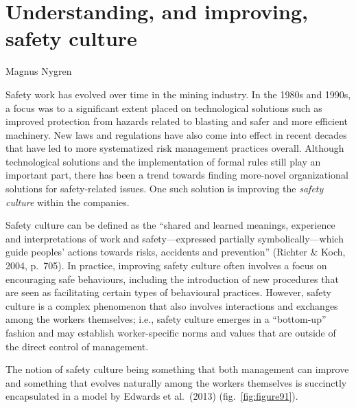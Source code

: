 \documentclass[
  12pt,
]{scrbook}
\newenvironment{chap-auth}
{\vspace{1cm}\begin{center}\begin{flushright}\sffamily\noindent}
  {\end{flushright}\end{center}\vspace{1cm}}
\begin{document}
\hypertarget{understanding-and-improving-safety-culture}{%
\chapter{Understanding, and improving, safety culture}\label{understanding-and-improving-safety-culture}}

\begin{chap-auth}
Magnus Nygren
\end{chap-auth}

Safety work has evolved over time in the mining industry. In the 1980s and 1990s, a focus was to a significant extent placed on technological solutions such as improved protection from hazards related to blasting and safer and more efficient machinery. New laws and regulations have also come into effect in recent decades that have led to more systematized risk management practices overall. Although technological solutions and the implementation of formal rules still play an important part, there has been a trend towards finding more-novel organizational solutions for safety-related issues. One such solution is improving the \emph{safety culture} within the companies.

Safety culture can be defined as the ``shared and learned meanings, experience and interpretations of work and safety---expressed partially symbolically---which guide peoples' actions towards risks, accidents and prevention'' (Richter \& Koch, 2004, p.~705). In practice, improving safety culture often involves a focus on encouraging safe behaviours, including the introduction of new procedures that are seen as facilitating certain types of behavioural practices. However, safety culture is a complex phenomenon that also involves interactions and exchanges among the workers themselves; i.e., safety culture emerges in a ``bottom-up'' fashion and may establish worker-specific norms and values that are outside of the direct control of management.

The notion of safety culture being something that both management can improve and something that evolves naturally among the workers themselves is succinctly encapsulated in a model by Edwards et al.~(2013) (fig.~\ref{fig:figure91}).
\end{document}
